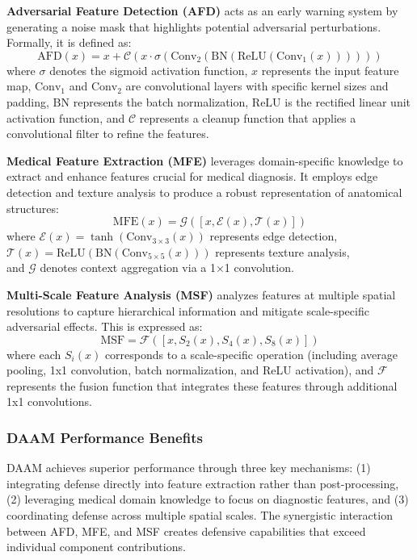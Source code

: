 \documentclass[preprint,12pt]{elsarticle}
\begin{document}
\textbf{Adversarial Feature Detection (AFD)} acts as an early warning system by generating a noise mask that highlights potential adversarial perturbations\cite{Rossolini24}. Formally, it is defined as:
\begin{equation}
\text{AFD}(x) = x + \mathcal{C}(x \cdot \sigma(\text{Conv}_2(\text{BN}(\text{ReLU}(\text{Conv}_1(x))))))
\end{equation}
where $\sigma$ denotes the sigmoid activation function, $x$ represents the input feature map, $\text{Conv}_1$ and $\text{Conv}_2$ are convolutional layers with specific kernel sizes and padding, $\text{BN}$ represents the batch normalization, $\text{ReLU}$ is the rectified linear unit activation function, and $\mathcal{C}$ represents a cleanup function that applies a convolutional filter to refine the features.

\textbf{Medical Feature Extraction (MFE)} leverages domain-specific knowledge to extract and enhance features crucial for medical diagnosis\cite{Woo18}. It employs edge detection and texture analysis to produce a robust representation of anatomical structures:
\begin{equation}
\text{MFE}(x) = \mathcal{G}([x, \mathcal{E}(x), \mathcal{T}(x)])
\end{equation}
where $\mathcal{E}(x) = \tanh(\text{Conv}_{3 \times 3}(x))$ represents edge detection, \\
$\mathcal{T}(x) = \text{ReLU}(\text{BN}(\text{Conv}_{5 \times 5}(x)))$ represents texture analysis, \\
and $\mathcal{G}$ denotes context aggregation via a 1×1 convolution.

\textbf{Multi-Scale Feature Analysis (MSF)} analyzes features at multiple spatial resolutions to capture hierarchical information and mitigate scale-specific adversarial effects\cite{Rossolini24}. This is expressed as:
\begin{equation}
\text{MSF} = \mathcal{F}([x, S_2(x), S_4(x), S_8(x)])
\end{equation}
where each $S_i(x)$ corresponds to a scale-specific operation (including average pooling, 1x1 convolution, batch normalization, and ReLU activation), and $\mathcal{F}$ represents the fusion function that integrates these features through additional 1x1 convolutions.

\subsubsection{DAAM Performance Benefits}
DAAM achieves superior performance through three key mechanisms: (1) integrating defense directly into feature extraction rather than post-processing, (2) leveraging medical domain knowledge to focus on diagnostic features, and (3) coordinating defense across multiple spatial scales. The synergistic interaction between AFD, MFE, and MSF creates defensive capabilities that exceed individual component contributions.
\end{document}
